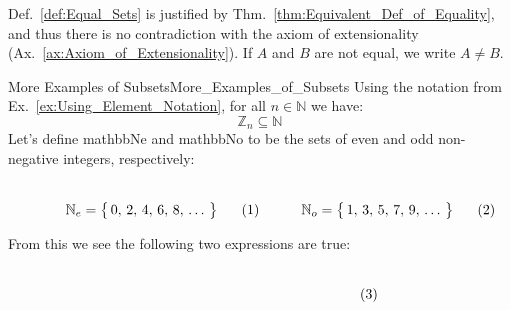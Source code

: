         Def.~\ref{def:Equal_Sets} is justified by
        Thm.~\ref{thm:Equivalent_Def_of_Equality}, and thus there is no
        contradiction with the axiom of extensionality
        (Ax.~\ref{ax:Axiom_of_Extensionality}). If $A$ and $B$ are not equal, we
        write $A\ne{B}$.
        \begin{lexample}{More Examples of Subsets}{More_Examples_of_Subsets}
            Using the notation from Ex.~\ref{ex:Using_Element_Notation}, for all
            $n\in\mathbb{N}$ we have:
            \begin{equation}
                \mathbb{Z}_{n}\subseteq\mathbb{N}
            \end{equation}
            Let's define \gls{mathbbNe} and \gls{mathbbNo} to be the sets of
            even and odd
            non-negative integers, respectively:
            \par
            \begin{subequations}
                \begin{minipage}[b]{0.49\textwidth}
                    \centering
                    \begin{equation}
                        \label{eqn:Even_Pos_Ints_Ellipses}%
                        \mathbb{N}_{e}=\big\{\,0,\,2,\,4,\,6,\,8,\,\dots\,\big\}
                    \end{equation}
                \end{minipage}
                \hfill
                \begin{minipage}[b]{0.49\textwidth}
                    \centering
                    \begin{equation}
                        \label{eqn:Odd_Pos_Ints_Ellipses}%
                        \mathbb{N}_{o}=\big\{\,1,\,3,\,5,\,7,\,9,\,\dots\,\big\}
                    \end{equation}
                \end{minipage}
            \end{subequations}
            \par\vspace{2.5ex}
            From this we see the following two expressions are true:
            \par
            \begin{subequations}
                \begin{minipage}[b]{0.49\textwidth}
                    \centering
                    \begin{equation}

\end{equation}
\end{minipage}
\end{subequations}
\end{lexample}
